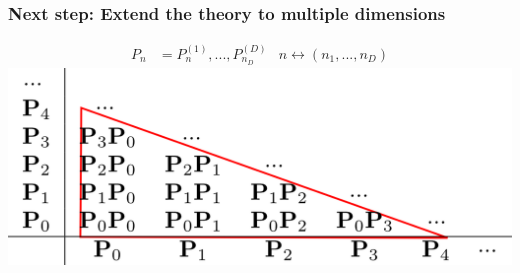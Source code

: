 \documentclass{beamer}
\begin{document}
\begin{frame}
 \frametitle{Next step: Extend the theory to multiple dimensions}
 \pause
  \begin{align*}
  P_n &= P^{(1)}_n, ..., P^{(D)}_{n_D}
  & n\longleftrightarrow (n_1, ..., n_D)
  \end{align*}
  \pause
  \includegraphics[width=\textwidth]{multidim.png}

 \end{frame}
\end{document}
